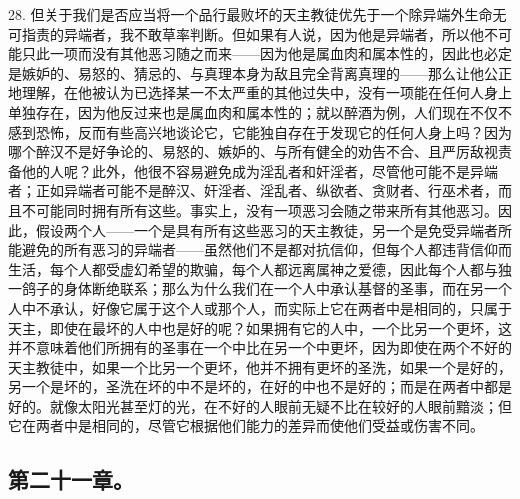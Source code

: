 28. 但关于我们是否应当将一个品行最败坏的天主教徒优先于一个除异端外生命无可指责的异端者，我不敢草率判断。但如果有人说，因为他是异端者，所以他不可能只此一项而没有其他恶习随之而来——因为他是属血肉和属本性的，因此也必定是嫉妒的、易怒的、猜忌的、与真理本身为敌且完全背离真理的——那么让他公正地理解，在他被认为已选择某一不太严重的其他过失中，没有一项能在任何人身上单独存在，因为他反过来也是属血肉和属本性的；就以醉酒为例，人们现在不仅不感到恐怖，反而有些高兴地谈论它，它能独自存在于发现它的任何人身上吗？因为哪个醉汉不是好争论的、易怒的、嫉妒的、与所有健全的劝告不合、且严厉敌视责备他的人呢？此外，他很不容易避免成为淫乱者和奸淫者，尽管他可能不是异端者；正如异端者可能不是醉汉、奸淫者、淫乱者、纵欲者、贪财者、行巫术者，而且不可能同时拥有所有这些。事实上，没有一项恶习会随之带来所有其他恶习。因此，假设两个人——一个是具有所有这些恶习的天主教徒，另一个是免受异端者所能避免的所有恶习的异端者——虽然他们不是都对抗信仰，但每个人都违背信仰而生活，每个人都受虚幻希望的欺骗，每个人都远离属神之爱德，因此每个人都与独一鸽子的身体断绝联系；那么为什么我们在一个人中承认基督的圣事，而在另一个人中不承认，好像它属于这个人或那个人，而实际上它在两者中是相同的，只属于天主，即使在最坏的人中也是好的呢？如果拥有它的人中，一个比另一个更坏，这并不意味着他们所拥有的圣事在一个中比在另一个中更坏，因为即使在两个不好的天主教徒中，如果一个比另一个更坏，他并不拥有更坏的圣洗，如果一个是好的，另一个是坏的，圣洗在坏的中不是坏的，在好的中也不是好的；而是在两者中都是好的。就像太阳光甚至灯的光，在不好的人眼前无疑不比在较好的人眼前黯淡；但它在两者中是相同的，尽管它根据他们能力的差异而使他们受益或伤害不同。\par


\subsection{第二十一章。}

